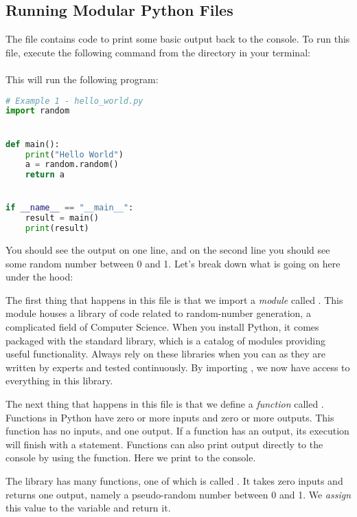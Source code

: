 \subsection{Running Modular Python Files}

The file  contains code to print some basic output back to the console.
To run this file, execute the following command from the  directory in your terminal:\\
\\
This will run the following program:

\begin{lstlisting}[language=Python]
# Example 1 - hello_world.py
import random


def main():
    print("Hello World")
    a = random.random()
    return a


if __name__ == "__main__":
    result = main()
    print(result)
\end{lstlisting}

You should see the output  on one line, and on the second line you should see some random number between 0 and 1.
Let's break down what is going on here under the hood:

The first thing that happens in this file is that we import a \textit{module} called . This module houses a library of code related to random-number generation, a complicated field of Computer Science.
When you install Python, it comes packaged with the standard library, which is a catalog of modules providing useful functionality. Always rely on these libraries when you can as they are written by experts and tested continuously.
By importing , we now have access to everything in this library.

The next thing that happens in this file is that we define a \textit{function} called . Functions in Python have zero or more inputs and zero or more outputs. This function has no inputs, and one output.
If a function has an output, its execution will finish with a  statement.
Functions can also print output directly to the console by using the  function.
Here we print  to the console.

The  library has many functions, one of which is called .
It takes zero inputs and returns one output, namely a pseudo-random number between 0 and 1.
We \textit{assign} this value to the variable  and return it.

